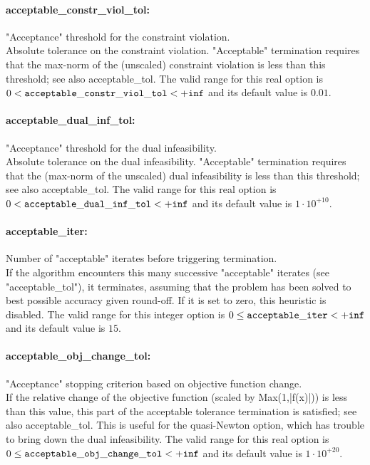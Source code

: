 \paragraph{acceptable\_constr\_viol\_tol:}\label{opt:acceptable_constr_viol_tol} "Acceptance" threshold for the constraint violation. \\
 Absolute tolerance on the constraint violation. "Acceptable" termination requires that the max-norm of the (unscaled) constraint violation is less than this threshold; see also acceptable\_tol. The valid range for this real option is 
$0 <  {\tt acceptable\_constr\_viol\_tol } <  {\tt +inf}$
and its default value is $0.01$.


\paragraph{acceptable\_dual\_inf\_tol:}\label{opt:acceptable_dual_inf_tol} "Acceptance" threshold for the dual infeasibility. \\
 Absolute tolerance on the dual infeasibility. "Acceptable" termination requires that the (max-norm of the unscaled) dual infeasibility is less than this threshold; see also acceptable\_tol. The valid range for this real option is 
$0 <  {\tt acceptable\_dual\_inf\_tol } <  {\tt +inf}$
and its default value is $1 \cdot 10^{+10}$.


\paragraph{acceptable\_iter:}\label{opt:acceptable_iter} Number of "acceptable" iterates before triggering termination. \\
 If the algorithm encounters this many successive "acceptable" iterates (see "acceptable\_tol"), it terminates, assuming that the problem has been solved to best possible accuracy given round-off.  If it is set to zero, this heuristic is disabled. The valid range for this integer option is
$0 \le {\tt acceptable\_iter } <  {\tt +inf}$
and its default value is $15$.


\paragraph{acceptable\_obj\_change\_tol:}\label{opt:acceptable_obj_change_tol} "Acceptance" stopping criterion based on objective function change. \\
 If the relative change of the objective function (scaled by Max(1,|f(x)|)) is less than this value, this part of the acceptable tolerance termination is satisfied; see also acceptable\_tol.  This is useful for the quasi-Newton option, which has trouble to bring down the dual infeasibility. The valid range for this real option is 
$0 \le {\tt acceptable\_obj\_change\_tol } <  {\tt +inf}$
and its default value is $1 \cdot 10^{+20}$.


